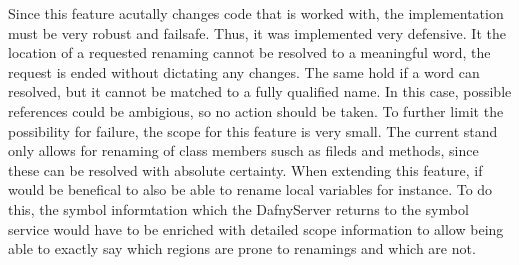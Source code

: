 Since this feature acutally changes code that is worked with, the implementation must be very robust and failsafe. Thus, it was implemented very defensive. It the location of a requested renaming cannot be resolved to a meaningful word, the request is ended without dictating any changes. The same hold if a word can resolved, but it cannot be matched to a fully qualified name. In this case, possible references could be ambigious, so no action should be taken. To further limit the possibility for failure, the scope for this feature is very small. The current stand only allows for renaming of class members susch as fileds and methods, since these can be resolved with absolute certainty.\newline
When extending this feature, if would be benefical to also be able to rename local variables for instance. To do this, the symbol informtation which the DafnyServer returns to the symbol service would have to be enriched with detailed scope information to allow being able to exactly say which regions are prone to renamings and which are not. 

